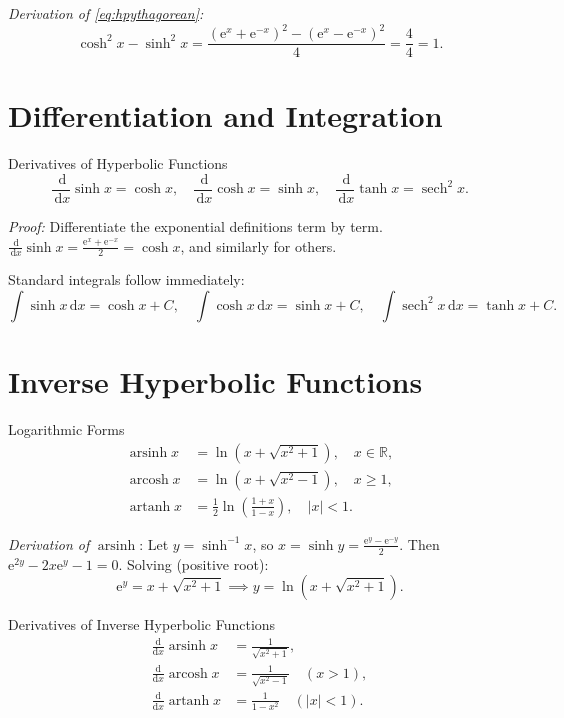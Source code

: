 \documentclass[12pt, a4paper]{book}
\DeclareMathOperator{\sech}{sech}
\newcommand{\arsinh}{\operatorname{arsinh}}
\newcommand{\arcosh}{\operatorname{arcosh}}
\newcommand{\artanh}{\operatorname{artanh}}
\newcommand{\R}{\mathbb{R}}
\newcommand{\dd}{\,\mathrm{d}}
\newcommand{\dx}{\,\mathrm{d}x}
\newcommand{\e}{\mathrm{e}}
\newcommand{\inv}{^{-1}}
\begin{document}
\textit{Derivation of \eqref{eq:hpythagorean}:}
\[
\cosh^2 x - \sinh^2 x
= \frac{(\e^x+\e^{-x})^2 - (\e^x-\e^{-x})^2}{4}
= \frac{4}{4} = 1.
\]

\section{Differentiation and Integration}

\begin{proposition}{Derivatives of Hyperbolic Functions}{}
\[
\frac{\dd}{\dx}\sinh x = \cosh x, \quad
\frac{\dd}{\dx}\cosh x = \sinh x, \quad
\frac{\dd}{\dx}\tanh x = \sech^2 x.
\]
\end{proposition}

\textit{Proof:} Differentiate the exponential definitions term by term. $\frac{\dd}{\dx}\sinh x = \frac{\e^x+\e^{-x}}{2}=\cosh x$, and similarly for others.

Standard integrals follow immediately:
\[
\int\sinh x\dx = \cosh x + C,\quad
\int\cosh x\dx = \sinh x + C,\quad
\int\sech^2 x\dx = \tanh x + C.
\]

\section{Inverse Hyperbolic Functions}

\begin{theorem}{Logarithmic Forms}{}
\begin{align*}
\arsinh x &= \ln\!\left(x + \sqrt{x^2+1}\right), \quad x\in\R,\\
\arcosh x &= \ln\!\left(x + \sqrt{x^2-1}\right), \quad x\geq 1,\\
\artanh x &= \tfrac{1}{2}\ln\!\left(\frac{1+x}{1-x}\right), \quad |x|<1.
\end{align*}
\end{theorem}

\textit{Derivation of} $\arsinh$: Let $y=\sinh\inv x$, so $x=\sinh y=\frac{\e^y-\e^{-y}}{2}$. Then $\e^{2y}-2x\e^y-1=0$. Solving (positive root):
\[
\e^y = x+\sqrt{x^2+1} \implies y = \ln(x+\sqrt{x^2+1}).
\]

\begin{proposition}{Derivatives of Inverse Hyperbolic Functions}{}
\[
\begin{aligned}
\frac{\mathrm{d}}{\mathrm{d}x}\arsinh x &= \frac{1}{\sqrt{x^2+1}}, \\
\frac{\mathrm{d}}{\mathrm{d}x}\arcosh x &= \frac{1}{\sqrt{x^2-1}} \quad (x>1), \\
\frac{\mathrm{d}}{\mathrm{d}x}\artanh x &= \frac{1}{1-x^2} \quad (|x|<1).
\end{aligned}
\]
\end{proposition}
\end{document}
